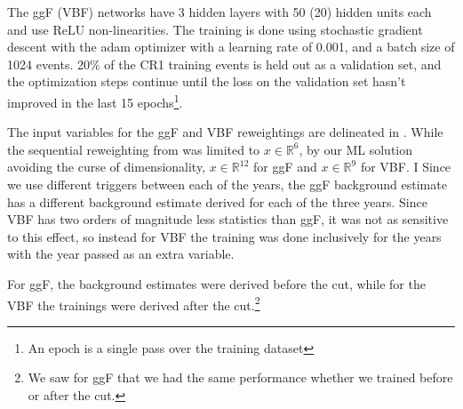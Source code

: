The ggF (VBF) networks have 3 hidden layers with 50 (20) hidden units each and use ReLU non-linearities. The training is done using stochastic gradient descent with the adam optimizer with a learning rate of 0.001, and a batch size of 1024 events. 20\% of the CR1 training events is held out as a validation set, and the optimization steps continue until the loss on the validation set hasn't improved in the last 15 epochs\footnote{An epoch is a single pass over the training dataset}.

The input variables for the ggF and VBF reweightings are delineated in \Tab{\ref{tab:rw-inputs}}. While the sequential reweighting from \cite{EXOT-2016-30} was limited to $x \in \mathbb{R}^6$, by our ML solution avoiding the curse of dimensionality, $x \in \mathbb{R}^12$ for ggF and $x\in \mathbb{R}^9$ for VBF. I 
Since we use different triggers between each of the years, the ggF background estimate has a different background estimate derived for each of the three years. Since VBF has two orders of magnitude less statistics than ggF, it was not as sensitive to this effect, so instead for VBF the training was done inclusively for the years with the year passed as an extra variable.

For ggF, the background estimates were derived before the \Xwt cut, while for the VBF the trainings were derived after the \Xwt cut.\footnote{We saw for ggF that we had the same performance whether we trained before or after the \Xwt cut.}
 
\def\checkmark{\tikz\fill[scale=0.4](0,.35) -- (.25,0) -- (1,.7) -- (.25,.15) -- cycle;}
\renewcommand{\arraystretch}{1.2}

